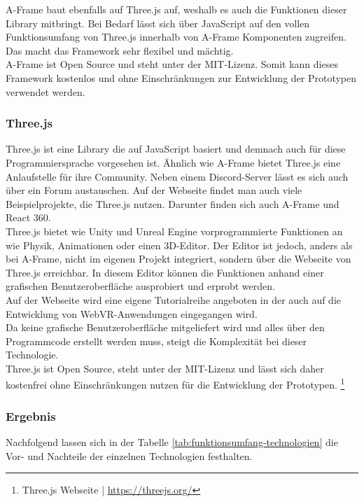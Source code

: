 \documentclass[a4paper,12pt,oneside]{article}
\begin{document}
        A-Frame baut ebenfalls auf Three.js auf, weshalb es auch die Funktionen
        dieser Library mitbringt. Bei Bedarf lässt sich über JavaScript auf 
        den vollen Funktionsumfang von Three.js innerhalb von A-Frame Komponenten
        zugreifen. Das macht das Framework sehr flexibel und mächtig. \\
        A-Frame ist Open Source und steht unter der MIT-Lizenz. Somit kann dieses
        Framework kostenlos und ohne Einschränkungen zur Entwicklung der 
        Prototypen verwendet werden. \\
      \subsubsection{Three.js}
        Three.js ist eine Library die auf JavaScript basiert und demnach auch
        für diese Programmiersprache vorgesehen ist. Ähnlich wie A-Frame bietet
        Three.js eine Anlaufstelle für ihre Community. Neben einem Discord-Server
        lässt es sich auch über ein Forum austauschen. Auf der Webseite findet man
        auch viele Beispielprojekte, die Three.js nutzen. Darunter finden sich auch
        A-Frame und React 360. \\
        Three.js bietet wie Unity und Unreal Engine vorprogrammierte Funktionen an
        wie Physik, Animationen oder einen 3D-Editor. Der Editor ist jedoch, anders
        als bei A-Frame, nicht im eigenen Projekt integriert, sondern über die
        Webseite von Three.js erreichbar. In diesem Editor können die
        Funktionen anhand einer grafischen Benutzeroberfläche ausprobiert und
        erprobt werden. \\
        Auf der Webseite wird eine eigene Tutorialreihe angeboten in der auch
        auf die Entwicklung von WebVR-Anwendungen eingegangen wird. \\
        Da keine grafische Benutzeroberfläche mitgeliefert wird und alles über den
        Programmcode erstellt werden muss, steigt die Komplexität bei dieser
        Technologie. \\
        Three.js ist Open Source, steht unter der MIT-Lizenz und lässt sich daher
        kostenfrei ohne Einschränkungen nutzen für die Entwicklung der Prototypen.
        \footnote{Three.js Webseite | \url{https://threejs.org/}}
      \subsubsection{Ergebnis}
        Nachfolgend lassen sich in der Tabelle \ref{tab:funktionsumfang-technologien} 
        die Vor- und Nachteile der einzelnen Technologien festhalten.
\end{document}
